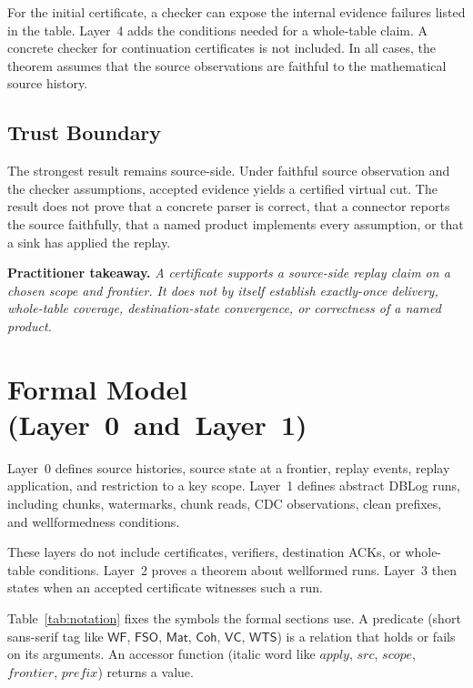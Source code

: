 \documentclass[letterpaper,10pt,twocolumn]{article}
\newcommand{\Apply}{\mathit{apply}}
\newcommand{\Src}{\mathit{src}}
\newcommand{\Scope}{\mathit{scope}}
\newcommand{\Frontier}{\mathit{frontier}}
\newcommand{\CleanPrefix}{\mathit{prefix}}
\newcommand{\WF}{\mathsf{WF}}
\newcommand{\FSO}{\mathsf{FSO}}
\newcommand{\Mat}{\mathsf{Mat}}
\newcommand{\Coh}{\mathsf{Coh}}
\newcommand{\VC}{\mathsf{VC}}
\newcommand{\WTS}{\mathsf{WTS}}
\begin{document}
For the initial certificate, a checker can expose the internal evidence
failures listed in the table. Layer~4 adds the conditions needed for a
whole-table claim. A concrete checker for continuation certificates is
not included. In all cases, the theorem assumes that the source
observations are faithful to the mathematical source history.

\subsection{Trust Boundary}\label{the-main-limitation-to-keep-in-mind}

The strongest result remains source-side. Under faithful source
observation and the checker assumptions, accepted evidence yields a
certified virtual cut. The result does not prove that a concrete parser
is correct, that a connector reports the source faithfully, that a
named product implements every assumption, or that a sink has applied
the replay.

\smallskip
\noindent\textbf{Practitioner takeaway.} \emph{A certificate supports a
source-side replay claim on a chosen scope and frontier. It does not by
itself establish exactly-once delivery, whole-table coverage,
destination-state convergence, or correctness of a named product.}

\section{Formal Model \mbox{(Layer 0 and Layer 1)}}\label{formal-model-layer-0-and-layer-1}

Layer~0 defines source histories, source state at a frontier, replay
events, replay application, and restriction to a key scope. Layer~1
defines abstract DBLog runs, including chunks, watermarks, chunk reads,
CDC observations, clean prefixes, and wellformedness conditions.

These layers do not include certificates, verifiers, destination ACKs,
or whole-table conditions. Layer~2 proves a theorem about wellformed
runs. Layer~3 then states when an accepted certificate witnesses such a
run.

Table~\ref{tab:notation} fixes the symbols the formal sections use. A
predicate (short sans-serif tag like $\WF$, $\FSO$, $\Mat$, $\Coh$,
$\VC$, $\WTS$) is a relation that holds or fails on its arguments. An
accessor function (italic word like $\Apply$, $\Src$, $\Scope$,
$\Frontier$, $\CleanPrefix$) returns a value.
\end{document}
